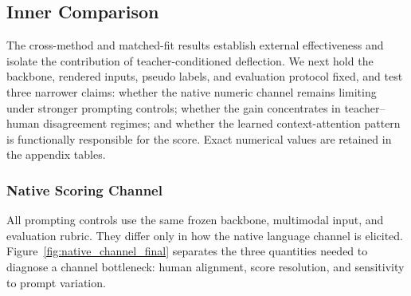 
\subsection{Inner Comparison}
\label{sec:inner_comparison}

The cross-method and matched-fit results establish external effectiveness and
isolate the contribution of teacher-conditioned deflection. We next hold the
backbone, rendered inputs, pseudo labels, and evaluation protocol fixed, and
test three narrower claims: whether the native numeric channel remains limiting
under stronger prompting controls; whether the gain concentrates in
teacher--human disagreement regimes; and whether the learned context-attention
pattern is functionally responsible for the score. Exact numerical values are
retained in the appendix tables.


\subsubsection{Native Scoring Channel}
\label{sec:native_channel}

All prompting controls use the same frozen backbone, multimodal input, and
evaluation rubric. They differ only in how the native language channel is
elicited. Figure~\ref{fig:native_channel_final} separates the three quantities
needed to diagnose a channel bottleneck: human alignment, score resolution,
and sensitivity to prompt variation.

